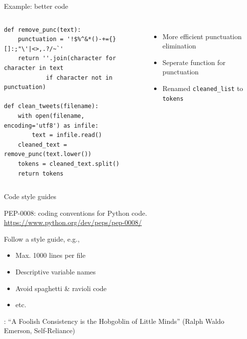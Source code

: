 \documentclass[aspectratio=169,usenames,dvipsnames]{beamer}
\begin{document}
\begin{frame}[fragile]{Example: better code}
\begin{columns}
\begin{lstlisting}
def remove_punc(text):
    punctuation = '!$%^&*()-+={}[]:;"\'|<>,.?/~`'
    return ''.join(character for character in text
            if character not in punctuation)

def clean_tweets(filename):
    with open(filename, encoding='utf8') as infile:
        text = infile.read()
    cleaned_text = remove_punc(text.lower())
    tokens = cleaned_text.split()
    return tokens
\end{lstlisting}
\begin{itemize}
\item More efficient punctuation elimination
\item Seperate function for punctuation
\item Renamed \texttt{cleaned\_list} to \texttt{tokens}
\end{itemize}
\end{columns}
\end{frame}

\begin{frame}{Code style guides}
    \begin{reference}
        PEP-0008: coding conventions for Python code.
        \url{https://www.python.org/dev/peps/pep-0008/}
    \end{reference}
    Follow a style guide, e.g.,
    \begin{itemize}
        \item Max. 1000 lines per file
        \item Descriptive variable names
        \item Avoid spaghetti \& ravioli code
        \item etc.
    \end{itemize}
    
    :
        ``A Foolish Consistency is the Hobgoblin of Little Minds''
        (Ralph Waldo Emerson, Self-Reliance)
\end{frame}
\end{document}
